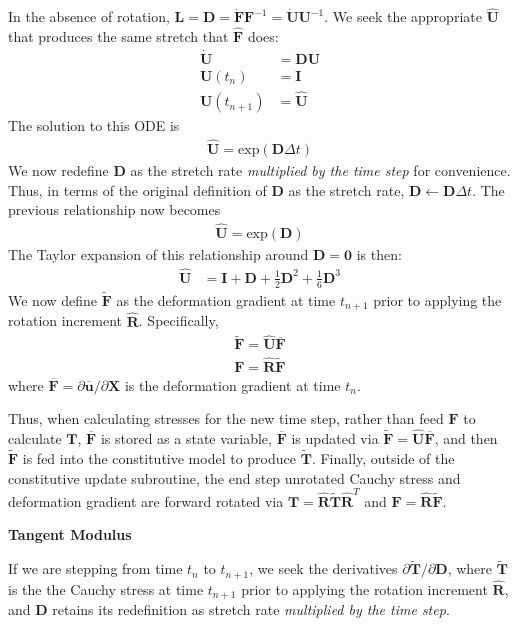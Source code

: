 In the absence of rotation, ${\bm L} = {\bm D} = \dot{\bm F}{\bm F}^{-1} = \dot{\bm U}{\bm U}^{-1}$. We seek the appropriate $\hat{\bm U}$ that produces the same stretch that $\hat{\bm F}$ does:
\begin{align}
\dot{\bm U} &= {\bm D}{\bm U} \\
{\bm U}(t_n) &= {\bm I} \\
{\bm U}(t_{n+1}) &= \hat{\bm U}
\end{align}
The solution to this ODE is
\begin{align}
\hat{\bm U} = \text{exp}({\bm D}\Delta t)
\end{align}
We now redefine ${\bm D}$ as the stretch rate \textit{multiplied by the time step} for convenience. Thus, in terms of the original definition of ${\bm D}$ as the stretch rate, ${\bm D}\leftarrow{\bm D}\Delta t$. The previous relationship now becomes 
\begin{align}
\hat{\bm U} = \text{exp}({\bm D})
\end{align}
The Taylor expansion of this relationship around $\bm{D} = \bm{0}$ is then:
\begin{align}
\hat{\bm U} &= {\bm I} + {\bm D} + \frac{1}{2}{\bm D}^2 + \frac{1}{6}{\bm D}^3
\end{align}
We now define $\tilde {\bm F}$ as the deformation gradient at time $t_{n+1}$ prior to applying the rotation increment $\hat{\bm R}$. Specifically,
\begin{align}
\tilde {\bm F} = \hat{\bm U}\overline{\bm F} \\
{\bm F} = \hat{\bm R}\tilde {\bm F}
\end{align}
where $\overline{\bm F} = \partial {\overline{{\bm u}}}/\partial {\bm X}$ is the deformation gradient at time $t_n$.

Thus, when calculating stresses for the new time step, rather than feed ${\bm F}$ to calculate ${\bm T}$, $\overline {\bm F}$ is stored as a state variable, $\overline{\bm F}$ is updated via $\tilde {\bm F} = \hat{\bm U}\overline{\bm F} $, and then $\tilde{\bm{F}}$ is fed into the constitutive model to produce $\tilde{\bm T}$. Finally, outside of the constitutive update subroutine, the end step unrotated Cauchy stress and deformation gradient are forward rotated via ${\bm T} = \hat{\bm R}\tilde{\bm T}\hat{\bm R}^T$ and $\bm{F} = \hat{\bm{R}}\tilde{\bm{F}}$.

\textbf{Tangent Modulus}

If we are stepping from time $t_n$ to $t_{n+1}$, we seek the derivatives $\partial{\tilde{\bm T}}/\partial {\bm D}$, where $\tilde{\bm T}$ is the the Cauchy stress at time $t_{n+1}$ prior to applying the rotation increment $\hat{\bm R}$, and ${\bm D}$ retains its redefinition as stretch rate \textit{multiplied by the time step}.

